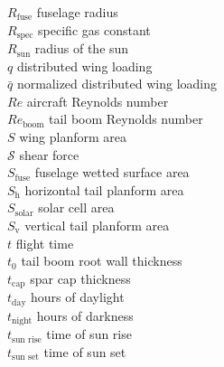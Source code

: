 \begin{multicols}{2}
\begin{tabbing}
$R_{\text{fuse}}$ \> fuselage radius \\ %
$R_{\text{spec}}$ \> specific gas constant \\ %
$R_{\text{sun}}$ \> radius of the sun \\
$q$ \> distributed wing loading \\ %
$\bar{q}$ \> normalized distributed wing loading \\
$Re$ \> aircraft Reynolds number \\
$Re_{\text{boom}}$ \> tail boom Reynolds number \\
$S$ \> wing planform area \\ %
$\mathcal{S}$ \> shear force \\ %
$S_{\text{fuse}}$ \> fuselage wetted surface area \\ %
$S_{\text{h}}$ \> horizontal tail planform area \\ %
$S_{\text{solar}}$ \> solar cell area \\ %
$S_{\text{v}}$ \> vertical tail planform area \\ %
$t$ \> flight time \\ %
$t_0$ \> tail boom root wall thickness \\ %
$t_{\text{cap}}$ \> spar cap thickness \\ %
$t_{\text{day}}$ \> hours of daylight \\ %
$t_{\text{night}}$ \> hours of darkness \\ %
$t_{\text{sun rise}}$ \> time of sun rise \\ %
$t_{\text{sun set}}$ \> time of sun set \\ %

\end{tabbing}
\end{multicols}
